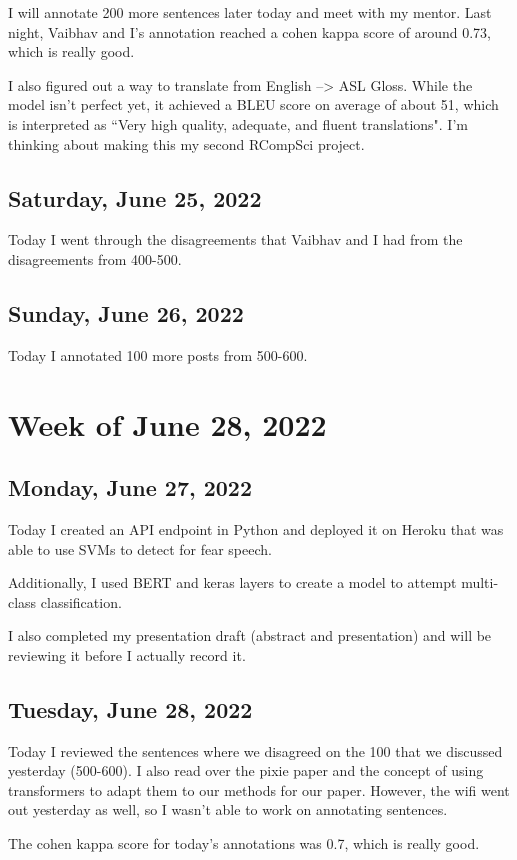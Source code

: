 \documentclass[11pt,letterpaper]{article}
\begin{document}
I will annotate 200 more sentences later today and meet with my mentor. Last night, Vaibhav and I's annotation reached a cohen kappa score of around 0.73, which is really good.


I also figured out a way to translate from English --> ASL Gloss. While the model isn't perfect yet, it achieved a BLEU score on average of about 51, which is interpreted as ``Very high quality, adequate, and fluent translations". I'm thinking about making this my second RCompSci project.

\subsection{Saturday, June 25, 2022}
Today I went through the disagreements that Vaibhav and I had from the disagreements from 400-500. 

\subsection{Sunday, June 26, 2022}
Today I annotated 100 more posts from 500-600.

\section{Week of June 28, 2022}
\subsection{Monday, June 27, 2022}
Today I created an API endpoint in Python and deployed it on Heroku that was able to use SVMs to detect for fear speech.

Additionally, I used BERT and keras layers to create a model to attempt multi-class classification.

I also completed my presentation draft (abstract and presentation) and will be reviewing it before I actually record it.

\subsection{Tuesday, June 28, 2022}
Today I reviewed the sentences where we disagreed on the 100 that we discussed yesterday (500-600). I also read over the pixie paper and the concept of using transformers to adapt them to our methods for our paper.
However, the wifi went out yesterday as well, so I wasn't able to work on annotating sentences.


The cohen kappa score for today's annotations was 0.7, which is really good.
\end{document}
